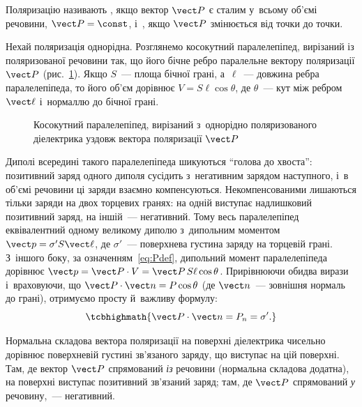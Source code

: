 Поляризацію називають , якщо вектор $\vect P$ є сталим у~всьому об'ємі
речовини, $\vect P = \const$, і~, якщо $\vect P$ змінюється від точки
до точки.

 Нехай поляризація однорідна. Розглянемо косокутний
паралелепіпед, вирізаний із поляризованої речовини так, що його бічне ребро паралельне
вектору поляризації $\vect P$ (рис.~\ref{pic:PolarizedParallelepiped}). Якщо $S$~--- площа
бічної грані, а~$\ell$~--- довжина ребра паралелепіпеда, то його об'єм дорівнює $V =
	S\ell\cos\theta$, де $\theta$~--- кут між ребром $\vect \ell$ і~нормаллю до бічної грані.

\begin{figure}\centering
	\caption{Косокутний паралелепіпед, вирізаний з~однорідно поляризованого діелектрика
		уздовж вектора поляризації $\vect P$\label{pic:PolarizedParallelepiped}}
\end{figure}

Диполі всередині такого паралелепіпеда шикуються \enquote{голова до хвоста}: позитивний
заряд одного диполя сусідить з~негативним зарядом наступного, і~в об'ємі речовини ці
заряди взаємно компенсуються. Некомпенсованими лишаються тільки заряди на двох торцевих
гранях: на одній виступає надлишковий позитивний заряд, на іншій~--- негативний. Тому весь
паралелепіпед еквівалентний одному великому диполю з~дипольним моментом $\vect p = \sigma'
	S \vect \ell$, де $\sigma'$~--- поверхнева густина 
заряду на торцевій грані. З~іншого боку, за означенням~\eqref{eq:Pdef}, дипольний момент
паралелепіпеда дорівнює $\vect p = \vect P \cdot V = \vect P \, S\ell\cos\theta$.
Прирівнюючи обидва вирази і~враховуючи, що $\vect P \cdot \vect n = P\cos\theta$ (де
$\vect n$~--- зовнішня нормаль до грані), отримуємо просту й~важливу формулу:
\begin{equation}\label{eq:SigmaPrime}
	\tcbhighmath{
		\vect P \cdot \vect n = P_n = \sigma'.
	}
\end{equation}

\begin{Attention}
	Нормальна складова вектора поляризації на поверхні діелектрика чисельно дорівнює
	поверхневій густині зв'язаного заряду, що виступає на цій поверхні. Там, де вектор
	$\vect P$ спрямований \emph{із} речовини (нормальна складова додатна), на поверхні
	виступає позитивний зв'язаний заряд; там, де $\vect P$ спрямований \emph{у}
	речовину,~--- негативний.
\end{Attention}


